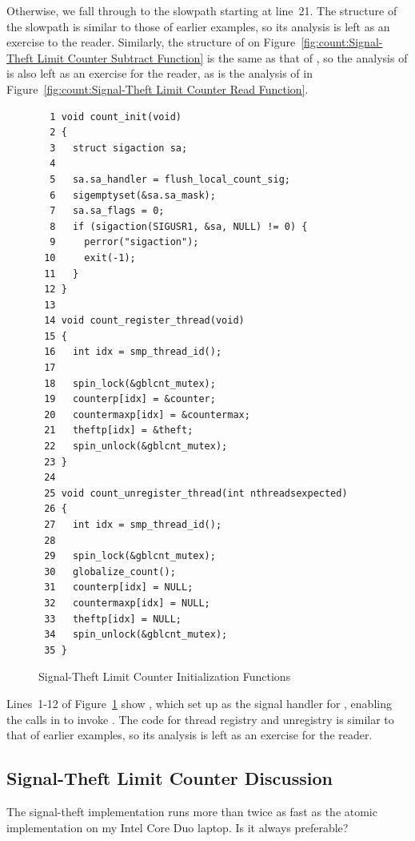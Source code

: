 Otherwise, we fall through to the slowpath starting at line~21.
The structure of the slowpath is similar to those of earlier examples,
so its analysis is left as an exercise to the reader.
Similarly, the structure of  on
Figure~\ref{fig:count:Signal-Theft Limit Counter Subtract Function}
is the same
as that of , so the analysis of  is also
left as an exercise for the reader, as is the analysis of
 in
Figure~\ref{fig:count:Signal-Theft Limit Counter Read Function}.

\begin{figure}[tbp]
{ \scriptsize
\begin{verbatim}
  1 void count_init(void)
  2 {
  3   struct sigaction sa;
  4 
  5   sa.sa_handler = flush_local_count_sig;
  6   sigemptyset(&sa.sa_mask);
  7   sa.sa_flags = 0;
  8   if (sigaction(SIGUSR1, &sa, NULL) != 0) {
  9     perror("sigaction");
 10     exit(-1);
 11   }
 12 }
 13 
 14 void count_register_thread(void)
 15 {
 16   int idx = smp_thread_id();
 17 
 18   spin_lock(&gblcnt_mutex);
 19   counterp[idx] = &counter;
 20   countermaxp[idx] = &countermax;
 21   theftp[idx] = &theft;
 22   spin_unlock(&gblcnt_mutex);
 23 }
 24 
 25 void count_unregister_thread(int nthreadsexpected)
 26 {
 27   int idx = smp_thread_id();
 28 
 29   spin_lock(&gblcnt_mutex);
 30   globalize_count();
 31   counterp[idx] = NULL;
 32   countermaxp[idx] = NULL;
 33   theftp[idx] = NULL;
 34   spin_unlock(&gblcnt_mutex);
 35 }
\end{verbatim}
}
\caption{Signal-Theft Limit Counter Initialization Functions}
\label{fig:count:Signal-Theft Limit Counter Initialization Functions}
\end{figure}

Lines~1-12 of
Figure~\ref{fig:count:Signal-Theft Limit Counter Initialization Functions}
show , which set up 
as the signal handler for ,
enabling the  calls in 
to invoke .
The code for thread registry and unregistry is similar to that of
earlier examples, so its analysis is left as an exercise for the
reader.

\subsection{Signal-Theft Limit Counter Discussion}

The signal-theft implementation runs more than twice as fast as the
atomic implementation on my Intel Core Duo laptop.
Is it always preferable?

